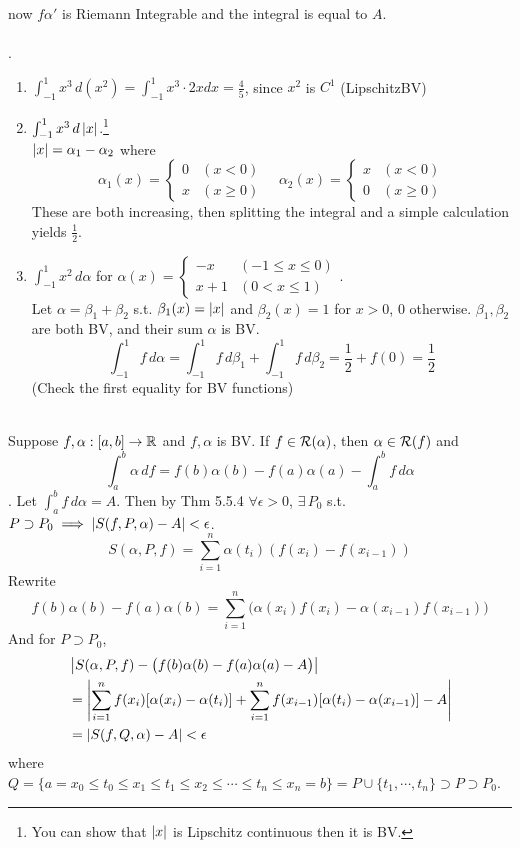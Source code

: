 now $f\alpha'$ is Riemann Integrable and the integral is equal to $A$.\\
\\
\ex.
\begin{enumerate}
	\item $\int_{-1}^1 x^3\,d(x^2) = \int_{-1}^1 x^3 \cdot 2xdx = \frac{4}{5}$, since $x^2$ is $C^1$ (\mimp Lipschitz\mimp BV)
	\item $\int_{-1}^1 x^3 \,d\left|x\right|$.\footnote{You can show that $\left|x\right|$ is Lipschitz continuous then it is BV.} \\
	$\left|x\right| = \alpha_1 - \alpha_2$ where
	$$\alpha_1(x) = \begin{cases}
		0 & (x < 0) \\ x & (x \geq 0)
	\end{cases} \quad \alpha_2(x) = \begin{cases}
		x & (x < 0) \\ 0 & (x\geq 0)
	\end{cases}$$
	These are both increasing, then splitting the integral and a simple calculation yields $\frac{1}{2}.$
	\item $\int_{-1}^1 x^2\,d\alpha$ for $\alpha(x) = \begin{cases}
		-x & (-1\leq x\leq 0) \\ x+1 & (0 < x\leq 1)
	\end{cases}$.\\
	Let $\alpha=\beta_1 + \beta_2$ s.t. $\beta_1(x) = \left|x\right|$ and $\beta_2(x) = 1$ for $x > 0$, 0 otherwise. $\beta_1, \beta_2$ are both BV, and their sum $\alpha$ is BV.\\
	$$\int_{-1}^1 f\,d\alpha = \int_{-1}^1 f\,d\beta_1 +  \int_{-1}^1 f\,d\beta_2 = \frac{1}{2} + f(0) = \frac{1}{2}$$
	(Check the first equality for BV functions)
\end{enumerate}~\\
 Suppose $f, \alpha:[a, b]\rightarrow \mathbb{R}$ and $f, \alpha$ is BV. If $f\in \mathcal{R}(\alpha)$, then $\alpha\in \mathcal{R}(f)$ and
$$\int_a^b \alpha\,df = f(b)\alpha(b) - f(a)\alpha(a) - \int_a^b f\,d\alpha$$
\pf. Let $\int_a^b f\,d\alpha = A$. Then by Thm 5.5.4 $\forall\epsilon > 0$, $\exists\,P_0$ s.t. $P\supset P_0 \implies \left|S(f, P, \alpha) - A\right| < \epsilon$.
$$S(\alpha, P, f) = \sum_{i=1}^n \alpha(t_i)(f(x_i) - f(x_{i-1}))$$
Rewrite $$f(b)\alpha(b) - f(a)\alpha(b) = \sum_{i=1}^n \big(\alpha(x_i)f(x_i) - \alpha(x_{i-1})f(x_{i-1})\big)$$
And for $P\supset P_0$,
$$\begin{aligned}
	&\left|S(\alpha, P, f) - \big( f(b)\alpha(b)-f(a)\alpha(a) - A \big)\right| \\
	&= \left|\sum_{i=1}^n f(x_i) [\alpha(x_i)-\alpha(t_i)] + \sum_{i=1}^n f(x_{i-1})[\alpha(t_i)-\alpha(x_{i-1})] - A\right|\\
	&= \left|S(f, Q, \alpha) - A\right| < \epsilon
\end{aligned}$$
where $Q = \{a=x_0 \leq t_0 \leq x_1 \leq t_1 \leq x_2 \leq \cdots \leq t_n \leq x_n = b \} = P\cup \{t_1,\cdots, t_n\} \supset P\supset P_0$.
\pagebreak